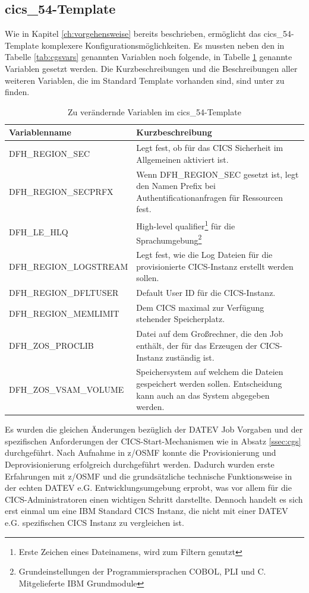 \subsection{\glqq cics\_54\grqq-Template}
Wie in Kapitel \ref{ch:vorgehensweise} bereits beschrieben, ermöglicht das \glqq cics\_54\grqq-Template komplexere Konfigurationsmöglichkeiten.
Es mussten neben den in Tabelle \ref{tab:cgsvars} genannten Variablen noch folgende, in Tabelle \ref{tab:c54vars} genannte Variablen gesetzt werden.
Die Kurzbeschreibungen und die Beschreibungen aller weiteren Variablen, die im Standard Template vorhanden sind, sind unter \cite{.26.2.2020b} zu finden.

\begin{table}[h]
\centering
\begin{tabularx}{\textwidth}{X|X}
Variablenname & Kurzbeschreibung \\
\hline
DFH\_REGION\_SEC & Legt fest, ob für das CICS Sicherheit im Allgemeinen aktiviert ist. \\
\hline
DFH\_REGION\_SECPRFX & Wenn DFH\_REGION\_SEC gesetzt ist, legt den Namen Prefix bei Authentificationanfragen für Ressourcen fest. \\
\hline
DFH\_LE\_HLQ & High-level qualifier\footnote{Erste Zeichen eines Dateinamens, wird zum Filtern genutzt} für die Sprachumgebung\footnote{Grundeinstellungen der Programmiersprachen COBOL, PLI und C. Mitgelieferte IBM Grundmodule} \\
\hline
DFH\_REGION\_LOGSTREAM & Legt fest, wie die Log Dateien für die provisionierte CICS-Instanz erstellt werden sollen. \\
\hline
DFH\_REGION\_DFLTUSER & Default User ID für die CICS-Instanz. \\
\hline
DFH\_REGION\_MEMLIMIT & Dem CICS maximal zur Verfügung stehender Speicherplatz. \\
\hline
DFH\_ZOS\_PROCLIB & Datei auf dem Großrechner, die den Job enthält, der für das Erzeugen der CICS-Instanz zuständig ist. \\
\hline
DFH\_ZOS\_VSAM\_VOLUME & Speichersystem auf welchem die Dateien gespeichert werden sollen. Entscheidung kann auch an das System abgegeben werden. \\
\end{tabularx}
\caption{Zu verändernde Variablen im \glqq cics\_54\grqq-Template}
\label{tab:c54vars}
\end{table}
Es wurden die gleichen Änderungen bezüglich der DATEV Job Vorgaben und der spezifischen Anforderungen der CICS-Start-Mechanismen wie in Absatz \ref{ssec:cgs} durchgeführt.
Nach Aufnahme in z/OSMF konnte die Provisionierung und Deprovisionierung erfolgreich durchgeführt werden.
Dadurch wurden erste Erfahrungen mit z/OSMF und die grundsätzliche technische Funktionsweise in der echten DATEV e.G. Entwicklungsumgebung erprobt, was vor allem für die CICS-Administratoren einen wichtigen Schritt darstellte.
Dennoch handelt es sich erst einmal um eine IBM Standard CICS Instanz, die nicht mit einer DATEV e.G. spezifischen CICS Instanz zu vergleichen ist.


